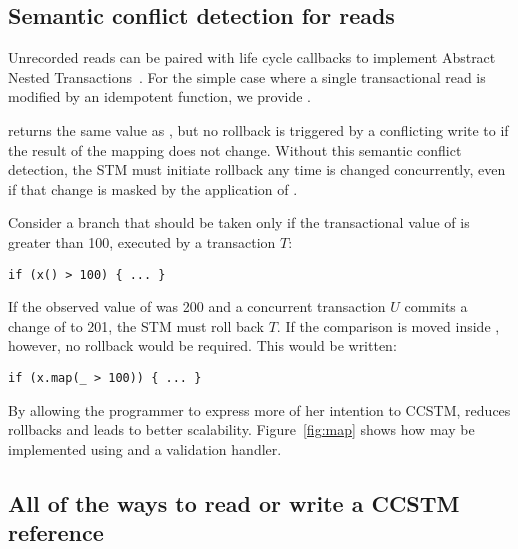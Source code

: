 \subsection{Semantic conflict detection for reads}
\label{sec:map}

Unrecorded reads can be paired with life cycle callbacks to implement
Abstract Nested Transactions~\cite{harris07abstract}.  For the simple case where
a single transactional read is modified by an idempotent function, we provide
\code{map[}\code{](f: }\code{ => }\code{): }.

 returns the same value as , but no rollback
is triggered by a conflicting write to  if the result of the mapping
does not change.  Without this
semantic conflict detection, the STM must initiate rollback any time 
is changed concurrently, even if that change is masked by the application of
.

Consider a branch that should be taken only if the transactional value of
 is greater than 100, executed by a transaction $T$:
\lstset{numbers=none}
\begin{lstlisting}
if (x() > 100) { ... }
\end{lstlisting}
\lstset{numbers=left}
If the observed value of  was 200 and a concurrent transaction $U$ commits
a change of  to 201, the STM must roll back $T$.  If the comparison is
moved inside , however, no rollback would be required.  This would be
written:
\lstset{numbers=none}
\begin{lstlisting}
if (x.map(_ > 100)) { ... }
\end{lstlisting}
\lstset{numbers=left}
By allowing the programmer to express more of her intention to CCSTM,
 reduces rollbacks and leads to better scalability.
Figure~\ref{fig:map} shows how  may be implemented using
 and a validation handler.



\subsection{All of the ways to read or write a CCSTM reference}

